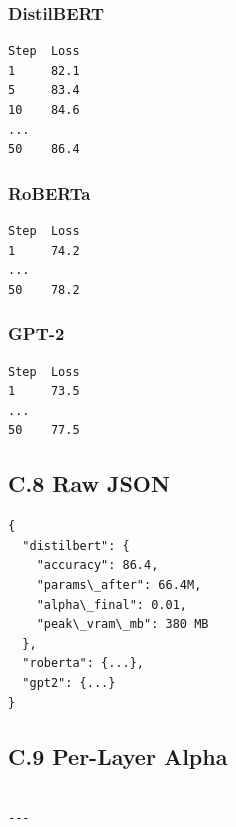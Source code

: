 \subsubsection{DistilBERT}

\begin{lstlisting}
Step  Loss
1     82.1
5     83.4
10    84.6
...
50    86.4
\end{lstlisting}

\subsubsection{RoBERTa}

\begin{lstlisting}
Step  Loss
1     74.2
...
50    78.2
\end{lstlisting}

\subsubsection{GPT-2}

\begin{lstlisting}
Step  Loss
1     73.5
...
50    77.5
\end{lstlisting}

\subsection{C.8 Raw JSON}

\begin{lstlisting}
{
  "distilbert": {
    "accuracy": 86.4,
    "params\_after": 66.4M,
    "alpha\_final": 0.01,
    "peak\_vram\_mb": 380 MB
  },
  "roberta": {...},
  "gpt2": {...}
}
\end{lstlisting}

\subsection{C.9 Per-Layer Alpha}

\begin{lstlisting}

---
\end{lstlisting}